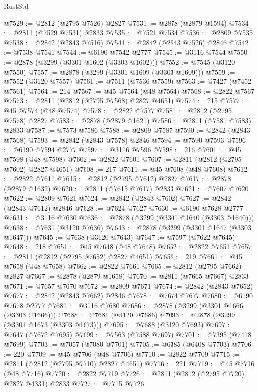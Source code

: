 \begin{lexlean}{RustStd}
\begin{coremodule}
{\begin{coremodule}
{{{{{{{{{{{{{{{{{{{{{{{{{{{{{{{{{@7529 := @2812 (@2795 @7526) @2827
@7531 := @2878 (@2879 @1594)
@7534 := @2811 (@7529 @7531) @2833
@7535 := @7521 @7534
@7536 := @2809 @7535
@7538 := @2842 (@2843 @7516)
@7541 := @2842 (@2843 @7526) @2846
@7542 := @7538 @7541
@7544 := @6190 @7542 @2777
@7545 := @3116 @7544
@7550 := @2878 (@3299 (@3301 @1602 (@3303 @1602)))
@7552 := @7545 (@3120 @7550)
@7557 := @2878 (@3299 (@3301 @1609 (@3303 @1609)))
@7559 := @7552 (@3120 @7557)
@7561 := @7511 (@7536 @7559)
@7563 := @7427 (@7452 @7561)
@7564 := 214
@7567 := @45 @7564 (@48 @7564)
@7568 := @2822 @7567
@7573 := @2811 (@2812 (@2795 @7568) @2827 @4651)
@7574 := 215
@7577 := @45 @7574 (@48 @7574)
@7578 := @2822 @7577
@7581 := @2812 (@2795 @7578) @2827
@7583 := @2878 (@2879 @1621)
@7586 := @2811 (@7581 @7583) @2833
@7587 := @7573 @7586
@7588 := @2809 @7587
@7590 := @2842 (@2843 @7568)
@7593 := @2842 (@2843 @7578) @2846
@7594 := @7590 @7593
@7596 := @6190 @7594 @2777
@7597 := @3116 @7596
@7598 := 216
@7601 := @45 @7598 (@48 @7598)
@7602 := @2822 @7601
@7607 := @2811 (@2812 (@2795 @7602) @2827 @4651)
@7608 := 217
@7611 := @45 @7608 (@48 @7608)
@7612 := @2822 @7611
@7615 := @2812 (@2795 @7612) @2827
@7617 := @2878 (@2879 @1632)
@7620 := @2811 (@7615 @7617) @2833
@7621 := @7607 @7620
@7622 := @2809 @7621
@7624 := @2842 (@2843 @7602)
@7627 := @2842 (@2843 @7612) @2846
@7628 := @7624 @7627
@7630 := @6190 @7628 @2777
@7631 := @3116 @7630
@7636 := @2878 (@3299 (@3301 @1640 (@3303 @1640)))
@7638 := @7631 (@3120 @7636)
@7643 := @2878 (@3299 (@3301 @1647 (@3303 @1647)))
@7645 := @7638 (@3120 @7643)
@7647 := @7597 (@7622 @7645)
@7648 := 218
@7651 := @45 @7648 (@48 @7648)
@7652 := @2822 @7651
@7657 := @2811 (@2812 (@2795 @7652) @2827 @4651)
@7658 := 219
@7661 := @45 @7658 (@48 @7658)
@7662 := @2822 @7661
@7665 := @2812 (@2795 @7662) @2827
@7667 := @2878 (@2879 @1658)
@7670 := @2811 (@7665 @7667) @2833
@7671 := @7657 @7670
@7672 := @2809 @7671
@7674 := @2842 (@2843 @7652)
@7677 := @2842 (@2843 @7662) @2846
@7678 := @7674 @7677
@7680 := @6190 @7678 @2777
@7681 := @3116 @7680
@7686 := @2878 (@3299 (@3301 @1666 (@3303 @1666)))
@7688 := @7681 (@3120 @7686)
@7693 := @2878 (@3299 (@3301 @1673 (@3303 @1673)))
@7695 := @7688 (@3120 @7693)
@7697 := @7647 (@7672 @7695)
@7699 := @7563 (@7588 @7697)
@7701 := @7395 (@7418 @7699)
@7703 := @7057 (@7080 @7701)
@7705 := @6385 (@6408 @7703)
@7706 := 220
@7709 := @45 @7706 (@48 @7706)
@7710 := @2822 @7709
@7715 := @2811 (@2812 (@2795 @7710) @2827 @4651)
@7716 := 221
@7719 := @45 @7716 (@48 @7716)
@7720 := @2822 @7719
@7726 := @2811 (@2812 (@2795 @7720) @2827 @4331) @2833
@7727 := @7715 @7726
}}}}}}}}}}}}}}}}}}}}}}}}}}}}}}}}}
\end{coremodule}}
\end{coremodule}
\end{lexlean}

